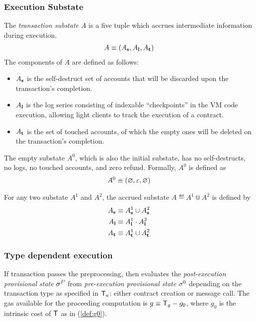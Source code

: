 \subsubsection{Execution Substate}
\label{subsubsec:substate}

The \emph{transaction substate} $A$ is a five tuple which accrues intermediate information during execution. 
\begin{align}
	A\equiv \left( A_{\bf s}, A_{\bf l}, A_{\bf t}\right)
\end{align}
The components of $A$ are defined as follows: 
\begin{itemize}[nosep]
	\item $A_{\bf s}$ is the self-destruct set of accounts that will be discarded upon the transaction's completion.

	\item $A_{\bf l}$ is the log series consisting of indexable ``checkpoints'' in the VM code execution, allowing light clients to track the execution of a contract.

	\item $A_{\bf t}$ is the set of touched accounts, of which the empty ones will be deleted on the transaction's completion.
\end{itemize}

The empty substate $A^0$, which is also the initial substate, has no self-destructs, no logs, no touched accounts, and zero refund. Formally, $A^0$ is defined as
\begin{align}
	A^0\equiv \left( \varnothing, \mathbb{\varepsilon}, \varnothing\right)
\end{align}

For any two substate $A^1$ and $A^2$, the accrued substate $A\eqdef A^1\Cup A^2$ is defined by 
\begin{align}
	A_{\bf s} &\equiv A^1_{\bf s} \cup A^2_{\bf s} \\ 
	A_{\bf l} &\equiv A^1_{\bf l} \cdot A^2_{\bf l} \\
	A_{\bf t} &\equiv A^1_{\bf t} \cup A^2_{\bf t} 
\end{align}


\subsubsection{Type dependent execution}

If transaction passes the preprocessing, 
then {\name} evaluates the \emph{post-execution provisional state} $\mathbf{\sigma}^P$ from \emph{pre-execution provisional state} $\mathbf{\sigma}^0$ depending on the transaction type as specified in $\textsf{T}_a$: either contract creation or message call. 
%
The gas available for the proceeding computation is $g\equiv \textsf{T}_g-g_0$, where $g_0$ is the intrinsic cost of $\textsf{T}$ as in (\ref{def:g0}). 

